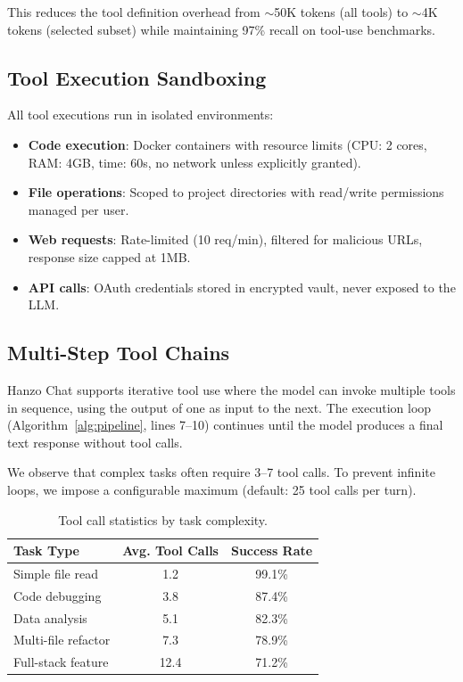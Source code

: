 \documentclass[11pt,twocolumn]{article}
\begin{document}
This reduces the tool definition overhead from $\sim$50K tokens (all tools) to $\sim$4K tokens (selected subset) while maintaining 97\% recall on tool-use benchmarks.

\subsection{Tool Execution Sandboxing}

All tool executions run in isolated environments:

\begin{itemize}[leftmargin=1.1em]
    \item \textbf{Code execution}: Docker containers with resource limits (CPU: 2 cores, RAM: 4GB, time: 60s, no network unless explicitly granted).
    \item \textbf{File operations}: Scoped to project directories with read/write permissions managed per user.
    \item \textbf{Web requests}: Rate-limited (10 req/min), filtered for malicious URLs, response size capped at 1MB.
    \item \textbf{API calls}: OAuth credentials stored in encrypted vault, never exposed to the LLM.
\end{itemize}

\subsection{Multi-Step Tool Chains}

Hanzo Chat supports iterative tool use where the model can invoke multiple tools in sequence, using the output of one as input to the next. The execution loop (Algorithm~\ref{alg:pipeline}, lines 7--10) continues until the model produces a final text response without tool calls.

We observe that complex tasks often require 3--7 tool calls. To prevent infinite loops, we impose a configurable maximum (default: 25 tool calls per turn).

\begin{table}[H]
\centering
\small
\begin{tabular}{lcc}
\toprule
\textbf{Task Type} & \textbf{Avg. Tool Calls} & \textbf{Success Rate} \\
\midrule
Simple file read & 1.2 & 99.1\% \\
Code debugging & 3.8 & 87.4\% \\
Data analysis & 5.1 & 82.3\% \\
Multi-file refactor & 7.3 & 78.9\% \\
Full-stack feature & 12.4 & 71.2\% \\
\bottomrule
\end{tabular}
\caption{Tool call statistics by task complexity.}
\label{tab:tool_stats}
\end{table}
\end{document}
